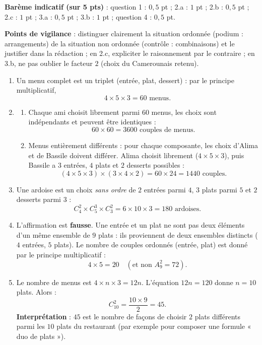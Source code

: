 \documentclass[11pt]{article}
\begin{document}
\begin{corrige}
\begin{enumerate}
\end{enumerate}
\textbf{Barème indicatif (sur 5 pts)} : question 1 : $0,5$ pt ; 2.a : $1$ pt ; 2.b : $0,5$ pt ; 2.c : $1$ pt ; 3.a : $0,5$ pt ; 3.b : $1$ pt ; question 4 : $0,5$ pt.\par
\textbf{Points de vigilance} : distinguer clairement la situation ordonnée (podium : arrangements) de la situation non ordonnée (contrôle : combinaisons) et le justifier dans la rédaction ; en 2.c, expliciter le raisonnement par le contraire ; en 3.b, ne pas oublier le facteur $2$ (choix du Camerounais retenu).
\end{corrige}

\begin{corrige}
\begin{enumerate}
\item Un menu complet est un triplet (entrée, plat, dessert) : par le principe multiplicatif,
\[ 4 \times 5 \times 3 = 60 \text{ menus}. \]
\item 
\begin{enumerate}
\item Chaque ami choisit librement parmi $60$ menus, les choix sont indépendants et peuvent être identiques :
\[ 60 \times 60 = 3600 \text{ couples de menus}. \]
\item Menus entièrement différents : pour chaque composante, les choix d'Alima et de Bassile doivent différer. Alima choisit librement ($4 \times 5 \times 3$), puis Bassile a $3$ entrées, $4$ plats et $2$ desserts possibles :
\[ (4 \times 5 \times 3) \times (3 \times 4 \times 2) = 60 \times 24 = 1440 \text{ couples}. \]
\end{enumerate}
\item Une ardoise est un choix \emph{sans ordre} de $2$ entrées parmi $4$, $3$ plats parmi $5$ et $2$ desserts parmi $3$ :
\[ C_4^2 \times C_5^3 \times C_3^2 = 6 \times 10 \times 3 = 180 \text{ ardoises}. \]
\item L'affirmation est \textbf{fausse}. Une entrée et un plat ne sont pas deux éléments d'un même ensemble de $9$ plats : ils proviennent de deux ensembles distincts ($4$ entrées, $5$ plats). Le nombre de couples ordonnés (entrée, plat) est donné par le principe multiplicatif :
\[ 4 \times 5 = 20 \quad (\text{et non } A_9^2 = 72). \]
\item Le nombre de menus est $4 \times n \times 3 = 12n$. L'équation $12n = 120$ donne $n = 10$ plats. Alors :
\[ C_{10}^2 = \frac{10 \times 9}{2} = 45. \]
\textbf{Interprétation} : $45$ est le nombre de façons de choisir $2$ plats différents parmi les $10$ plats du restaurant (par exemple pour composer une formule « duo de plats »).

\end{enumerate}
\end{corrige}
\end{document}
